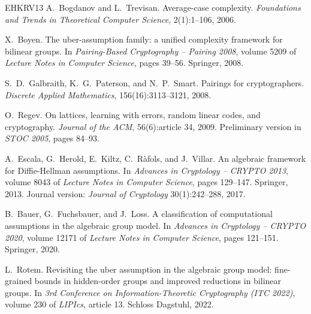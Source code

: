 \documentclass{conjura-solution}
\begin{document}
\begin{conjurabibliography}{EHKRV13}
A.~Bogdanov and L.~Trevisan.
Average-case complexity.
\emph{Foundations and Trends in Theoretical Computer Science}, 2(1):1--106, 2006.

X.~Boyen.
The uber-assumption family: a unified complexity framework for bilinear groups.
In \emph{Pairing-Based Cryptography -- Pairing 2008},
volume 5209 of \emph{Lecture Notes in Computer Science}, pages 39--56. Springer, 2008.

S.~D.~Galbraith, K.~G.~Paterson, and N.~P.~Smart.
Pairings for cryptographers.
\emph{Discrete Applied Mathematics}, 156(16):3113--3121, 2008.

O.~Regev.
On lattices, learning with errors, random linear codes, and cryptography.
\emph{Journal of the ACM}, 56(6):article 34, 2009.
Preliminary version in \emph{STOC 2005}, pages 84--93.

A.~Escala, G.~Herold, E.~Kiltz, C.~R\`afols, and J.~Villar.
An algebraic framework for Diffie-Hellman assumptions.
In \emph{Advances in Cryptology -- CRYPTO 2013},
volume 8043 of \emph{Lecture Notes in Computer Science}, pages 129--147. Springer, 2013.
Journal version: \emph{Journal of Cryptology} 30(1):242--288, 2017.

B.~Bauer, G.~Fuchsbauer, and J.~Loss.
A classification of computational assumptions in the algebraic group model.
In \emph{Advances in Cryptology -- CRYPTO 2020},
volume 12171 of \emph{Lecture Notes in Computer Science}, pages 121--151. Springer, 2020.

L.~Rotem.
Revisiting the uber assumption in the algebraic group model: fine-grained bounds in
hidden-order groups and improved reductions in bilinear groups.
In \emph{3rd Conference on Information-Theoretic Cryptography (ITC 2022)},
volume 230 of \emph{LIPIcs}, article 13. Schloss Dagstuhl, 2022.

\end{conjurabibliography}
\end{document}
